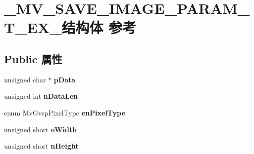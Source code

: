 \hypertarget{struct___m_v___s_a_v_e___i_m_a_g_e___p_a_r_a_m___t___e_x__}{}\section{\+\_\+\+M\+V\+\_\+\+S\+A\+V\+E\+\_\+\+I\+M\+A\+G\+E\+\_\+\+P\+A\+R\+A\+M\+\_\+\+T\+\_\+\+E\+X\+\_\+结构体 参考}
\label{struct___m_v___s_a_v_e___i_m_a_g_e___p_a_r_a_m___t___e_x__}
\subsection*{Public 属性}
\begin{DoxyCompactItemize}
\item 
\mbox{\label{struct___m_v___s_a_v_e___i_m_a_g_e___p_a_r_a_m___t___e_x___a3f0aca229cacff3fd66be1fad7ad64a5}} 
unsigned char $\ast$ {\bfseries p\+Data}
\item 
\mbox{\label{struct___m_v___s_a_v_e___i_m_a_g_e___p_a_r_a_m___t___e_x___ad789ae03ec83401c557b44978bf11aa4}} 
unsigned int {\bfseries n\+Data\+Len}
\item 
\mbox{\label{struct___m_v___s_a_v_e___i_m_a_g_e___p_a_r_a_m___t___e_x___ae456b100270f0ae769d672d8e1baf7ec}} 
enum Mv\+Gvsp\+Pixel\+Type {\bfseries en\+Pixel\+Type}
\item 
\mbox{\label{struct___m_v___s_a_v_e___i_m_a_g_e___p_a_r_a_m___t___e_x___ad692e9889809f7c21639710f22f2dfd7}} 
unsigned short {\bfseries n\+Width}
\item 
\mbox{\label{struct___m_v___s_a_v_e___i_m_a_g_e___p_a_r_a_m___t___e_x___a12818aafb13231adae39d0396dfd089f}} 
unsigned short {\bfseries n\+Height}
\item 
\mbox{\label{struct___m_v___s_a_v_e___i_m_a_g_e___p_a_r_a_m___t___e_x___a04c6dcd3c82850c2c5e6844ba7dae155}} 

\end{DoxyCompactItemize}
